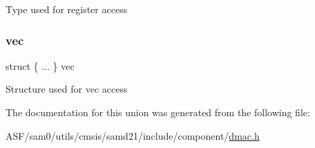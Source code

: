 Type used for register access \mbox{\label{union_d_m_a_c___b_u_s_y_c_h___type_a292006aa3c689bb7cc5750f46acc753c}} 
\subsubsection{\texorpdfstring{vec}{vec}}
{\footnotesize\ttfamily struct \{ ... \}   vec}

Structure used for vec access 

The documentation for this union was generated from the following file\+:\begin{DoxyCompactItemize}
\item 
A\+S\+F/sam0/utils/cmsis/samd21/include/component/\mbox{\hyperlink{component_2dmac_8h}{dmac.\+h}}\end{DoxyCompactItemize}
